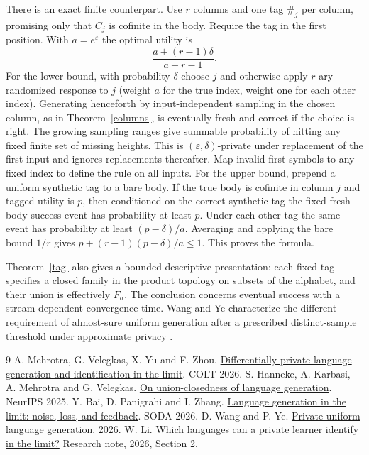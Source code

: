 \documentclass[11pt]{article}
\begin{document}
There is an exact finite counterpart. Use $r$ columns and one tag $\#_j$ per column, promising only that $C_j$ is cofinite in the body. Require the tag in the first position. With $a=e^\varepsilon$ the optimal utility is
\[
                 \frac{a+(r-1)\delta}{a+r-1}.
\]
For the lower bound, with probability $\delta$ choose $j$ and otherwise apply $r$-ary randomized response to $j$ (weight $a$ for the true index, weight one for each other index). Generating henceforth by input-independent sampling in the chosen column, as in Theorem~\ref{columns}, is eventually fresh and correct if the choice is right. The growing sampling ranges give summable probability of hitting any fixed finite set of missing heights. This is $(\varepsilon,\delta)$-private under replacement of the first input and ignores replacements thereafter. Map invalid first symbols to any fixed index to define the rule on all inputs.
For the upper bound, prepend a uniform synthetic tag to a bare body. If the true body is cofinite in column $j$ and tagged utility is $p$, then conditioned on the correct synthetic tag the fixed fresh-body success event has probability at least $p$. Under each other tag the same event has probability at least $(p-\delta)/a$. Averaging and applying the bare bound $1/r$ gives $p+(r-1)(p-\delta)/a\le1$. This proves the formula.

Theorem~\ref{tag} also gives a bounded descriptive presentation: each fixed tag specifies a closed family in the product topology on subsets of the alphabet, and their union is effectively $F_\sigma$. The conclusion concerns eventual success with a stream-dependent convergence time. Wang and Ye characterize the different requirement of almost-sure uniform generation after a prescribed distinct-sample threshold under approximate privacy \cite{wy}.

\begin{thebibliography}{9}
 A. Mehrotra, G. Velegkas, X. Yu and F. Zhou. \href{https://arxiv.org/abs/2604.08504}{Differentially private language generation and identification in the limit}. COLT 2026.
 S. Hanneke, A. Karbasi, A. Mehrotra and G. Velegkas. \href{https://arxiv.org/abs/2506.18642}{On union-closedness of language generation}. NeurIPS 2025.
 Y. Bai, D. Panigrahi and I. Zhang. \href{https://arxiv.org/abs/2507.15319}{Language generation in the limit: noise, loss, and feedback}. SODA 2026.
 D. Wang and P. Ye. \href{https://arxiv.org/abs/2611.00797}{Private uniform language generation}. 2026.
 W. Li. \href{https://github.com/VictorLiwentao/solved-problems/tree/main/results/learning-theory/private-language-identification}{Which languages can a private learner identify in the limit?} Research note, 2026, Section 2.
\end{thebibliography}
\end{document}
